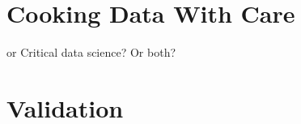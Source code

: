\begin{comment}
vgl \cite{GeiHal2017}
iterative mixed method
combination of:
* quantitative methods: mining big data sets/computational social science
"begin with one or
more large (but often thin) datasets generated by a software platform, which has recorded digital
traces that users leave in interacting on that platform. Such researchers then seek to mine as much
signal and significance from these found datasets as they can at scale in order to answer a research
question"
* more traditional social science/qualitative methods, e.g. interviews, observations, experiments

\cite{Geiger2014}
"the idea that Wikipedia only takes place on wiki-
pedia.org – or even entirely on the Internet – is a huge misunderstanding (Konieczny, 2009;
Reagle, 2010). Wikipedia is not a virtual world, especially one located entirely on the wiki."
e.g. in order to get hold of abuse_filter_history I had to engage with
- wikipedia.org
- mediawiki.org
- irc channels
- phabricator
- gerrit
- toolserver/cloudservices
----
other spaces Wikipedia takes place
- mailinglists
- WomenEdit/offenes Editieren @Wikimedia
- Wikimania
- Wikimedia's office and daily work
\end{comment}

\section{Cooking Data With Care}
or Critical data science? Or both?

\section{Validation}
